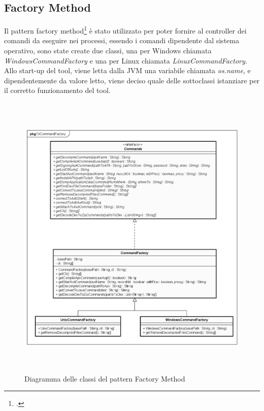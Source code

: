 \newpage
\subsection{Factory Method}\label{subsec:factory-method}
Il pattern factory method\footcite{womak:factory-method} è stato utilizzato per poter fornire al controller dei comandi da eseguire nei processi, essendo i comandi dipendente dal sistema operativo, sono state create due classi, una per Windows chiamata \textit{WindowsCommandFactory} e una per Linux chiamata \textit{LinuxCommandFactory}.
Allo start-up del tool, viene letta dalla JVM una variabile chiamata \textit{os.name}, e dipendentemente da valore letto, viene deciso quale delle sottoclassi istanziare per il corretto funzionamento del tool.
\begin{figure}[H]
    \centering
    \includegraphics[width=14cm, height=14cm]{./immagini/diagrammi_uml/CommandFactory.png}
    \caption{Diagramma delle classi del pattern Factory Method}\label{fig:factory-method}
\end{figure}